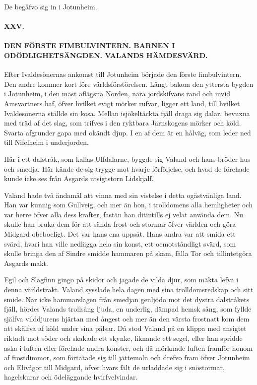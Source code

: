De begåfvo sig in i Jotunheim.

\paragraph{XXV.}

\paragraph{DEN FÖRSTE FIMBULVINTERN. BARNEN I ODÖDLIGHETSÄNGDEN. VALANDS
HÄMDESVÄRD.}

Efter Ivaldesönernas ankomst till Jotunheim började den förste
fimbulvintern. Den andre kommer kort före världsförstörelsen. Långt
bakom den yttersta bygden i Jotunheim, i den mäst aflägsna Norden, nära
jordskifvans rand och invid Amsvartners haf, öfver hvilket evigt mörker
rufvar, ligger ett land, till hvilket Ivaldesönerna ställde sin kosa.
Mellan isjökeltäckta fjäll draga sig dalar, bevuxna med träd af det
slag, som trifves i den ryktbara Järnskogens mörker och köld.
\protect\hypertarget{lb1625905.xhtmlux5cux23start80}{}{}\protect\hypertarget{lb1625905.xhtmlux5cux23start80-a}{}{}\protect\hypertarget{lb1625905.xhtmlux5cux23start80-b}{}{}\protect\hypertarget{lb1625905.xhtmlux5cux23start80-c}{}{}\protect\hypertarget{lb1625905.xhtmlux5cux23start80-d}{}{}
Svarta afgrunder gapa med okändt djup. I en af dem är en hålväg, som
leder ned till Nifelheim i underjorden.

Här i ett dalstråk, som kallas Ulfdalarne, byggde sig Valand och hans
bröder hus och smedja. Här kände de sig trygge mot hvarje förföljelse,
och hvad de förehade kunde icke ses från Asgards utsigtstorn Lidskjalf.

Valand hade två ändamål att vinna med sin vistelse i detta ogästvänliga
land. Han var kunnig som Gullveig, och mer än hon, i trolldomens alla
hemligheter och var herre öfver alla dess krafter, fastän han ditintills
ej velat använda dem. Nu skulle han bruka dem för att sända frost och
stormar öfver världen och göra Midgard obeboeligt. Det var hans ena
uppsåt. Hans andra var att smida ett svärd, hvari han ville nedlägga
hela sin konst, ett oemotståndligt svärd, som skulle bringa den af
Sindre smidde hammaren på skam, fälla Tor och tillintetgöra Asgards
makt.

Egil och Slagfinn gingo på skidor och jagade de vilda djur, som mäkta
lefva i denna världstrakt. Valand sysslade hela dagen med sina
trolldomsredskap och sitt smide. När icke hammarslagen från smedjan
genljödo mot det dystra dalstråkets fjäll, hördes Valands trollsång
ljuda, en underlig, dämpad hemsk sång, som fyllde själfva vilddjurens
hjärtan med ångest och mer än den värsta frostnatt kom dem att skälfva
af köld under sina pälsar. Då stod Valand på en klippa med ansigtet
riktadt mot söder och skakade ett skynke, liknande ett segel, eller han
spridde aska i luften eller förehade andra konster, och då mörknade
luften framför honom af frostdimmor, som förtätade sig till jättemoln
och drefvo fram öfver Jotunheim och Elivågor till Midgard, öfver hvars
fält de urladdade sig i snöstormar, hagelskurar och ödeläggande
hvirfvelvindar.

